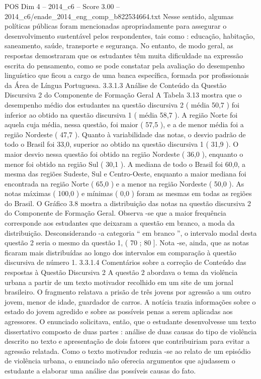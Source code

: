 \begin{textsample}{POS Dim 4 – 2014\_c6 – Score 3.00 – 2014\_c6/enade\_2014\_eng\_comp\_b822534664.txt}
Nesse sentido, algumas políticas públicas foram mencionadas apropriadamente para assegurar o desenvolvimento sustentável pelos respondentes, tais como : educação, habitação, saneamento, saúde, transporte e segurança.
No entanto, de modo geral, as respostas demostraram que os estudantes têm muita dificuldade na expressão escrita do pensamento, como se pode constatar pela avaliação do desempenho linguístico que ficou a cargo de uma banca específica, formada por profissionais da Área de Língua Portuguesa. 3.3.1.3 Análise de Conteúdo da Questão Discursiva 2 do Componente de Formação Geral A Tabela 3.13 mostra que o desempenho médio dos estudantes na questão discursiva 2 ( média 50,7 ) foi inferior ao obtido na questão discursiva 1 ( média 58,7 ).
A região Norte foi aquela cuja média, nessa questão, foi maior ( 57,5 ), e a de menor média foi a região Nordeste ( 47,7 ).
Quanto à variabilidade das notas, o desvio padrão de todo o Brasil foi 33,0, superior ao obtido na questão discursiva 1 ( 31,9 ).
O maior desvio nessa questão foi obtido na região Nordeste ( 36,0 ), enquanto o menor foi obtido na região Sul ( 30,1 ).
A mediana de todo o Brasil foi 60,0, a mesma das regiões Sudeste, Sul e Centro-Oeste, enquanto a maior mediana foi encontrada na região Norte ( 65,0 ) e a menor na região Nordeste ( 50,0 ).
As notas máximas ( 100,0 ) e mínimas ( 0,0 ) foram as mesmas em todas as regiões do Brasil.
O Gráfico 3.8 mostra a distribuição das notas na questão discursiva 2 do Componente de Formação Geral.
Observa -se que a maior frequência corresponde aos estudantes que deixaram a questão em branco, a moda da distribuição.
Desconsiderando -a categoria “ em branco ”, o intervalo modal desta questão 2 seria o mesmo da questão 1, ( 70 ; 80 ].
Nota -se, ainda, que as notas ficaram mais distribuídas ao longo dos intervalos em comparação à questão discursiva de número 1. 3.3.1.4 Comentários sobre a correção de Conteúdo das respostas à Questão Discursiva 2 A questão 2 abordava o tema da violência urbana a partir de um texto motivador recolhido em um site de um jornal brasileiro.
O fragmento relatava a prisão de três jovens por agressão a um outro jovem, menor de idade, guardador de carros.
A notícia trazia informações sobre o estado do jovem agredido e sobre as possíveis penas a serem aplicadas aos agressores.
O enunciado solicitava, então, que o estudante desenvolvesse um texto dissertativo composto de duas partes : análise de duas causas do tipo de violência descrito no texto e apresentação de dois fatores que contribuiriam para evitar a agressão relatada.
Como o texto motivador reduzia -se ao relato de um episódio de violência urbana, o enunciado não oferecia argumentos que ajudassem o estudante a elaborar uma análise das possíveis causas do fato.

\end{textsample}
